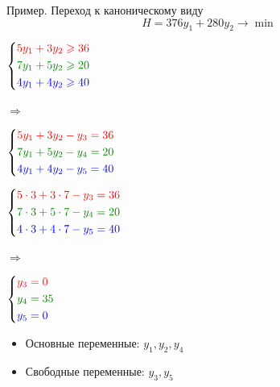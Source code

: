 \documentclass[unicode,11pt,notheorems,xcolor=table]{beamer}
\begin{document}
\begin{frame}{Пример. Переход к каноническому виду}
$$
	H = 376y_1+280y_2 \to \min
$$

\begin{minipage}{0.25\textwidth}
 $\left\lbrace
  \begin{aligned}
    \color{red} 5y_1+3y_2 & \color{red}\geqslant 36\\
    \color{green!50!black}7y_1+5y_2 & \color{green!50!black} \geqslant 20\\
    \color{blue}  4y_1+4y_2 &\color{blue}\geqslant 40\\
  \end{aligned}  \right.
 $
\end{minipage}
\hfill $\Longrightarrow$\hfill
\begin{minipage}{0.4\textwidth}
 $\left\lbrace
  \begin{aligned}
    \color{red} 5y_1+3y_2 - y_3 & \color{red} = 36\\
    \color{green!50!black}7y_1+5y_2-y_4 & \color{green!50!black} = 20\\
    \color{blue}  4y_1+4y_2-y_5 &\color{blue}= 40\\
  \end{aligned}  \right.
 $
\end{minipage}

\bigskip
{}

\begin{minipage}{0.25\textwidth}
 $\left\lbrace
  \begin{aligned}
    \color{red} 5\cdot 3+3 \cdot 7- y_3 & \color{red} = 36\\
    \color{green!50!black}7\cdot 3+5\cdot 7-y_4 & \color{green!50!black} = 20\\
    \color{blue}  4\cdot 3 + 4\cdot 7-y_5 &\color{blue}= 40\\
  \end{aligned}  \right.
 $
\end{minipage}
\hfill $\Longrightarrow$\hfill
\begin{minipage}{0.4\textwidth}
 $\left\lbrace
  \begin{aligned}
    \color{red} y_3 & \color{red} = 0\\
    \color{green!50!black} y_4 & \color{green!50!black} = 35\\
    \color{blue}  y_5 &\color{blue}= 0\\
  \end{aligned}  \right.
 $
\end{minipage}

\bigskip
{}
\begin{itemize}
\item 
	Основные переменные: $y_1,y_2,y_4$
\item 
	Свободные переменные: $y_3,y_5$
\end{itemize}


\end{frame}
\end{document}
